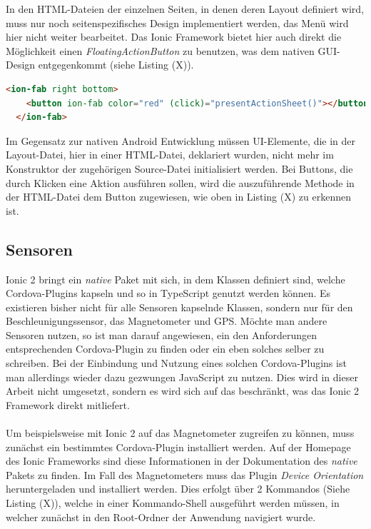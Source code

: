 In den HTML-Dateien der einzelnen Seiten, in denen deren Layout definiert wird, muss nur noch seitenspezifisches Design implementiert werden, das Menü wird hier nicht weiter bearbeitet. Das Ionic Framework bietet hier auch direkt die Möglichkeit einen \textit{FloatingActionButton} zu benutzen, was dem nativen GUI-Design entgegenkommt (siehe Listing (X)).

\begin{lstlisting}[caption=Deklaration eines \textit{FloatingActionButton}, label=lst:FloatingActionButtonIonic, language=html]
<ion-fab right bottom>
    <button ion-fab color="red" (click)="presentActionSheet()"></button>
  </ion-fab>
\end{lstlisting}

Im Gegensatz zur nativen Android Entwicklung müssen UI-Elemente, die in der Layout-Datei, hier in einer HTML-Datei, deklariert wurden, nicht mehr im Konstruktor der zugehörigen Source-Datei initialisiert werden. Bei Buttons, die durch Klicken eine Aktion ausführen sollen, wird die auszuführende Methode in der HTML-Datei dem Button zugewiesen, wie oben in Listing (X) zu erkennen ist. 

\subsection{Sensoren}

Ionic 2 bringt ein \textit{native} Paket mit sich, in dem Klassen definiert sind, welche Cordova-Plugins kapseln und so in TypeScript genutzt werden können. Es existieren bisher nicht für alle Sensoren kapselnde Klassen, sondern nur für den Beschleunigungssensor, das Magnetometer und GPS. Möchte man andere Sensoren nutzen, so ist man darauf angewiesen, ein den Anforderungen entsprechenden Cordova-Plugin zu finden oder ein eben solches selber zu schreiben. Bei der Einbindung und Nutzung eines solchen Cordova-Plugins ist man allerdings wieder dazu gezwungen JavaScript zu nutzen. Dies wird in dieser Arbeit nicht umgesetzt, sondern es wird sich auf das beschränkt, was das Ionic 2 Framework direkt mitliefert.
\\
\\
Um beispielsweise mit Ionic 2 auf das Magnetometer zugreifen zu können, muss zunächst ein bestimmtes Cordova-Plugin installiert werden. Auf der Homepage des Ionic Frameworks sind diese Informationen in der Dokumentation des \textit{native} Pakets zu finden. Im Fall des Magnetometers muss das Plugin \textit{Device Orientation} heruntergeladen und installiert werden. Dies erfolgt über 2 Kommandos (Siehe Listing (X)), welche in einer Kommando-Shell ausgeführt werden müssen, in welcher zunächst in den Root-Ordner der Anwendung navigiert wurde. 

